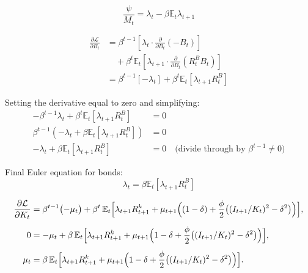 \documentclass[11pt,preprint]{elsarticle}
\numberwithin{equation}{section}
\numberwithin{figure}{section}
\numberwithin{table}{section}
\begin{document}
\begin{equation}\label{foc_M}
\boxed{\frac{\psi}{M_t} = \lambda_t - \beta \mathbb{E}_t \lambda_{t+1}}
\end{equation}

\begin{align*}
\frac{\partial \mathcal{L}}{\partial B_t} 
&= \beta^{t-1} \left[ 
   \lambda_t \cdot \frac{\partial}{\partial B_t} (-B_t) %
\right] \\
&\quad + \beta^{t} \mathbb{E}_t \left[ 
   \lambda_{t+1} \cdot \frac{\partial}{\partial B_t} (R^B_t B_t) %
\right] \\
&= \beta^{t-1} \left[ -\lambda_t \right] %
+ \beta^{t} \mathbb{E}_t \left[ \lambda_{t+1} R^B_t \right] %
\end{align*}

Setting the derivative equal to zero and simplifying: \begin{align*}
-\beta^{t-1}\lambda_t + \beta^{t}\mathbb{E}_t\left[\lambda_{t+1}R^B_t\right] &= 0 \\
\beta^{t-1}\left(-\lambda_t + \beta\mathbb{E}_t\left[\lambda_{t+1}R^B_t\right]\right) &= 0 \\
-\lambda_t + \beta\mathbb{E}_t\left[\lambda_{t+1}R^B_t\right] &= 0 \quad \text{(divide through by } \beta^{t-1} \neq 0\text{)}
\end{align*}

Final Euler equation for bonds: \begin{equation}\label{foc_B}
\boxed{\lambda_t = \beta \mathbb{E}_t\left[\lambda_{t+1}R^B_t\right]}
\end{equation}

\begin{align*}
\frac{\partial \mathcal{L}}{\partial K_t}
&= \beta^{t-1}\bigl(-\mu_t\bigr)
  + \beta^t\,\mathbb{E}_t\Bigl[
      \lambda_{t+1}R^k_{t+1}
    + \mu_{t+1}\Bigl(
        (1-\delta)
      + \frac{\phi}{2}\bigl((I_{t+1}/K_t)^2 - \delta^2\bigr)
    \Bigr)
  \Bigr], \\[1ex]
0
&= -\mu_t
  + \beta\,\mathbb{E}_t\Bigl[
      \lambda_{t+1}R^k_{t+1}
    + \mu_{t+1}\Bigl(
        1-\delta
      + \frac{\phi}{2}\bigl((I_{t+1}/K_t)^2 - \delta^2\bigr)
    \Bigr)
  \Bigr], \\[1ex]
\mu_t
&= \beta\,\mathbb{E}_t\Bigl[
      \lambda_{t+1}R^k_{t+1}
    + \mu_{t+1}\Bigl(
        1-\delta
      + \frac{\phi}{2}\bigl((I_{t+1}/K_t)^2 - \delta^2\bigr)
    \Bigr)
  \Bigr].
\end{align*}
\end{document}
